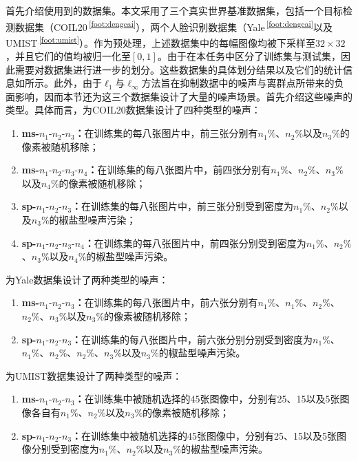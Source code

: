 首先介绍使用到的数据集。本文采用了三个真实世界基准数据集，包括一个目标检测数据集（COIL20\,\textsuperscript{\ref{foot:dengcai}}），两个人脸识别数据集（Yale\,\textsuperscript{\ref{foot:dengcai}}以及UMIST\,\textsuperscript{\ref{foot:umist}}）。作为预处理，上述数据集中的每幅图像均被下采样至$32 \times 32$，并且它们的值均被归一化至$[0,1]$。由于在本任务中区分了训练集与测试集，因此需要对数据集进行进一步的划分。这些数据集的具体划分结果以及它们的统计信息如所示。此外，由于$\ell_{1}$与$\ell_{\infty}$方法旨在抑制数据中的噪声与离群点所带来的负面影响，因而本节还为这三个数据集设计了大量的噪声场景。首先介绍这些噪声的类型。具体而言，为COIL20数据集设计了四种类型的噪声：
\begin{enumerate}
    \item {\boldmath\bfseries ms-$n_{1}\text{-}n_{2}\text{-}n_{3}$：}在训练集的每八张图片中，前三张分别有$n_{1}\%$、$n_{2}\%$以及$n_{3}\%$的像素被随机移除；
    \item {\boldmath\bfseries ms-$n_{1}\text{-}n_{2}\text{-}n_{3}\text{-}n_{4}$：}在训练集的每八张图片中，前四张分别有$n_{1}\%$、$n_{2}\%$、$n_{3}\%$以及$n_{4}\%$的像素被随机移除；
    \item {\boldmath\bfseries sp-$n_{1}\text{-}n_{2}\text{-}n_{3}$：}在训练集的每八张图片中，前三张分别受到密度为$n_{1}\%$、$n_{2}\%$以及$n_{3}\%$的椒盐型噪声污染；
    \item {\boldmath\bfseries sp-$n_{1}\text{-}n_{2}\text{-}n_{3}\text{-}n_{4}$：}在训练集的每八张图片中，前四张分别受到密度为$n_{1}\%$、$n_{2}\%$、$n_{3}\%$以及$n_{4}\%$的椒盐型噪声污染。
\end{enumerate}
为Yale数据集设计了两种类型的噪声：
\begin{enumerate}
    \item {\boldmath\bfseries ms-$n_{1}\text{-}n_{2}\text{-}n_{3}$：}在训练集的每八张图片中，前六张分别有$n_{1}\%$、$n_{1}\%$、$n_{2}\%$、$n_{2}\%$、$n_{3}\%$以及$n_{3}\%$的像素被随机移除；
    \item {\boldmath\bfseries sp-$n_{1}\text{-}n_{2}\text{-}n_{3}$：}在训练集的每八张图片中，前六张分别分别受到密度为$n_{1}\%$、$n_{1}\%$、$n_{2}\%$、$n_{2}\%$、$n_{3}\%$以及$n_{3}\%$的椒盐型噪声污染。
\end{enumerate}
为UMIST数据集设计了两种类型的噪声：
\begin{enumerate}
    \item {\boldmath\bfseries ms-$n_{1}\text{-}n_{2}\text{-}n_{3}$：}在训练集中被随机选择的45张图像中，分别有25、15以及5张图像各自有$n_{1}\%$、$n_{2}\%$以及$n_{3}\%$的像素被随机移除；
    \item {\boldmath\bfseries sp-$n_{1}\text{-}n_{2}\text{-}n_{3}$：}在训练集中被随机选择的45张图像中，分别有25、15以及5张图像分别受到密度为$n_{1}\%$、$n_{2}\%$以及$n_{3}\%$的椒盐型噪声污染。
\end{enumerate}
